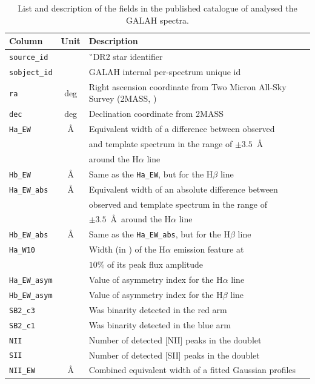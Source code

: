 \begin{table}
	\centering
	\caption{List and description of the fields in the published catalogue of analysed the GALAH spectra.}
	\label{tab:results}
	\begin{tabular}{l c l}
		\hline
		Column & Unit & Description \\
		\hline
		\texttt{source\_id} & & \G\ DR2 star identifier \\
		\texttt{sobject\_id} & & GALAH internal per-spectrum unique id \\
		\texttt{ra} & deg & Right ascension coordinate from Two Micron All-Sky Survey (2MASS, \cite{2006AJ....131.1163S})\\
		\texttt{dec} & deg & Declination coordinate from 2MASS\\
		\texttt{Ha\_EW} & \AA & Equivalent width of a difference between observed \\
		& & and template spectrum in the range of $\pm3.5$~\AA\ \\
		& & around the H$\alpha$ line \\
		\texttt{Hb\_EW} & \AA & Same as the \texttt{Ha\_EW}, but for the H$\beta$ line \\
		\texttt{Ha\_EW\_abs} & \AA & Equivalent width of an absolute difference between \\
		& & observed and template spectrum in the range of \\
		& & $\pm3.5$~\AA\ around the H$\alpha$ line \\
		\texttt{Hb\_EW\_abs} & \AA & Same as the \texttt{Ha\_EW\_abs}, but for the H$\beta$ line\\
		\texttt{Ha\_W10} & \kms & Width (in \kms) of the H$\alpha$ emission feature at \\
		& & $10$\% of its peak flux amplitude \\
		\texttt{Ha\_EW\_asym} & & Value of asymmetry index for the H$\alpha$ line \\
		\texttt{Hb\_EW\_asym} & & Value of asymmetry index for the H$\beta$ line \\
		\texttt{SB2\_c3} & & Was binarity detected in the red arm \\
		\texttt{SB2\_c1} & & Was binarity detected in the blue arm \\
		\texttt{NII} & & Number of detected [NII] peaks in the doublet \\
		\texttt{SII} & & Number of detected [SII] peaks in the doublet \\
		\texttt{NII\_EW} & \AA & Combined equivalent width of a fitted Gaussian profiles \\

\end{tabular}
\end{table}
